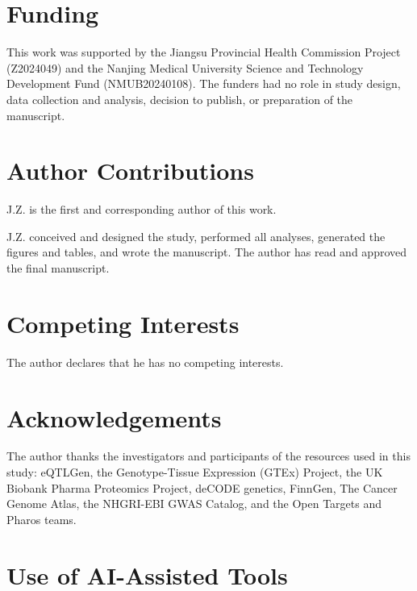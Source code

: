 \documentclass[11pt,a4paper]{article}
\begin{document}
\section*{Funding}

This work was supported by the Jiangsu Provincial Health Commission Project
(Z2024049) and the Nanjing Medical University Science and Technology
Development Fund (NMUB20240108). The funders had no role in study design, data
collection and analysis, decision to publish, or preparation of the manuscript.

\section*{Author Contributions}

J.Z. is the first and corresponding author of this work.

J.Z. conceived and designed the study, performed all analyses, generated the
figures and tables, and wrote the manuscript. The author has read and approved
the final manuscript.

\section*{Competing Interests}

The author declares that he has no competing interests.

\section*{Acknowledgements}

The author thanks the investigators and participants of the resources used in
this study: eQTLGen, the Genotype-Tissue Expression (GTEx) Project, the UK
Biobank Pharma Proteomics Project, deCODE genetics, FinnGen, The Cancer Genome
Atlas, the NHGRI-EBI GWAS Catalog, and the Open Targets and Pharos teams.

\section*{Use of AI-Assisted Tools}
\end{document}
